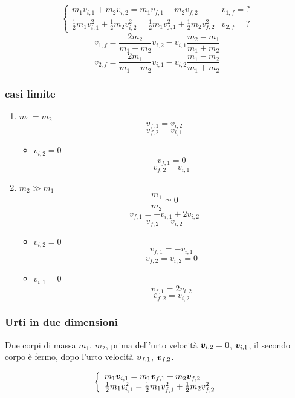 \[ \left \{
  \begin{array}{ll}
    m_1v_{i,1}+m_2v_{i,2}=m_1v_{f,1}+m_2v_{f,2}                                                     & v_{1,f}=? \\
    \frac{1}{2}m_1v_{i,1}^2+\frac{1}{2}m_2v_{i,2}^2=\frac{1}{2}m_1v_{f,1}^2+\frac{1}{2}m_2v_{f,2}^2 & v_{2,f}=?
  \end{array}
  \right.\]
\[v_{1,f}=\frac{2m_2}{m_1+m_2}v_{i,2}-v_{i,1}\frac{m_2-m_1}{m_1+m_2}\]
\[v_{2,f}=\frac{2m_1}{m_1+m_2}v_{i,1}-v_{i,2}\frac{m_1-m_2}{m_1+m_2}\]

\subsubsection{casi limite}
\label{casilimiteurti}
\begin{enumerate}
  \item $m_1=m_2$
        \[v_{f,1}=v_{i,2}\]
        \[v_{f,2}=v_{i,1}\]
        \begin{itemize}
          \item $v_{i,2}=0$
                \[v_{f,1}=0\]
                \[v_{f,2}=v_{i,1}\]
        \end{itemize}
  \item $m_2\gg m_1$
        \[\frac{m_1}{m_2}\simeq 0\]
        \[v_{f,1}=-v_{i,1}+2v_{i,2}\]
        \[v_{f,2}=v_{i,2}\]
        \begin{itemize}
          \item $v_{i,2}=0$
                \[v_{f,1}=-v_{i,1}\]
                \[v_{f,2}=v_{i,2}=0\]
          \item $v_{i,1}=0$
                \[v_{f,1}=2v_{i,2}\]
                \[v_{f,2}=v_{i,2}\]
        \end{itemize}

\end{enumerate}

\subsubsection{Urti in due dimensioni}
Due corpi di massa $m_1$, $m_2$, prima dell'urto velocità $\boldsymbol{v}_{i,2}=0$, $\boldsymbol{v}_{i,1}$, il secondo corpo è fermo, dopo l'urto velocità $\boldsymbol{v}_{f,1}$, $\boldsymbol{v}_{f,2}$.

\[\left\{
  \begin{array}{l}
    m_1\boldsymbol{v}_{i,1}=m_1\boldsymbol{v}_{f,1}+m_2\boldsymbol{v}_{f,2} \\
    \frac{1}{2}m_1 v_{i,1}^2=\frac{1}{2}m_1 v_{f,1}^2+\frac{1}{2}m_2
    v_{f,2}^2
  \end{array}\right.\]

